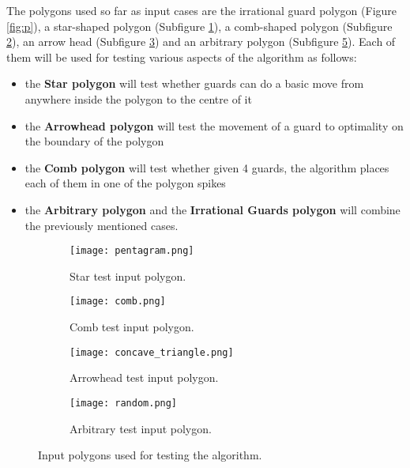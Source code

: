 The polygons used so far as input cases are the irrational guard polygon (Figure \ref{fig:p}), a star-shaped polygon (Subfigure \ref{fig:star}), a comb-shaped polygon (Subfigure \ref{fig:comb}), an arrow head (Subfigure \ref{fig:concave}) and an arbitrary polygon (Subfigure \ref{fig:random}). Each of them will be used for testing various aspects of the algorithm as follows:

\begin{itemize}
    \item the \textbf{Star polygon} will test whether guards can do a basic move from anywhere inside the polygon to the centre of it
    \item the \textbf{Arrowhead polygon} will test the movement of a guard to optimality on the boundary of the polygon
    \item the \textbf{Comb polygon} will test whether given 4 guards, the algorithm places each of them in one of the polygon spikes
    \item the \textbf{Arbitrary polygon} and the \textbf{Irrational Guards polygon} will combine the previously mentioned cases.
\end{itemize}

\begin{figure}[h!]
    \centering
    \begin{subfigure}{0.45\textwidth}
        \centering
        \texttt{[image: pentagram.png]}
        \caption{Star test input polygon.}
        \label{fig:star}
    \end{subfigure}
    \begin{subfigure}{0.45\textwidth}
        \centering
        \texttt{[image: comb.png]}
        \caption{Comb test input polygon.}
        \label{fig:comb}
    \end{subfigure}
    \begin{subfigure}{0.45\textwidth}
        \centering
        \texttt{[image: concave\_triangle.png]}
        \caption{Arrowhead test input polygon.}
        \label{fig:concave}
    \end{subfigure}
    \begin{subfigure}{0.45\textwidth}
        \centering
        \texttt{[image: random.png]}
        \caption{Arbitrary test input polygon.}
        \label{fig:random}
    \end{subfigure}
    \caption{Input polygons used for testing the algorithm.}
\end{figure}

